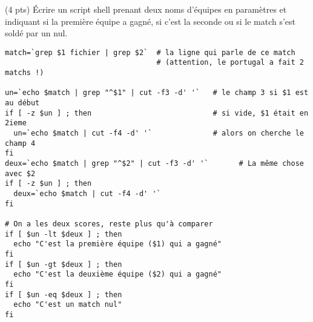 \documentclass[10pt]{article}
\begin{document}
\begin{Exercice}
\Question (4 pts) Écrire un script shell prenant deux noms d'équipes en
paramètres et indiquant si la première équipe a gagné, si c'est la seconde ou
si le match s'est soldé par un nul.

\begin{Reponse}
  \begin{Verbatim}
match=`grep $1 fichier | grep $2`  # la ligne qui parle de ce match 
                                   # (attention, le portugal a fait 2 matchs !)

un=`echo $match | grep "^$1" | cut -f3 -d' '`   # le champ 3 si $1 est au début
if [ -z $un ] ; then                            # si vide, $1 était en 2ieme
  un=`echo $match | cut -f4 -d' '`              # alors on cherche le champ 4
fi
deux=`echo $match | grep "^$2" | cut -f3 -d' '`       # La même chose avec $2
if [ -z $un ] ; then 
  deux=`echo $match | cut -f4 -d' '`
fi

# On a les deux scores, reste plus qu'à comparer
if [ $un -lt $deux ] ; then 
  echo "C'est la première équipe ($1) qui a gagné"
fi
if [ $un -gt $deux ] ; then 
  echo "C'est la deuxième équipe ($2) qui a gagné"
fi
if [ $un -eq $deux ] ; then 
  echo "C'est un match nul"
fi
  \end{Verbatim}
\end{Reponse}
\end{Exercice}
\end{document}
